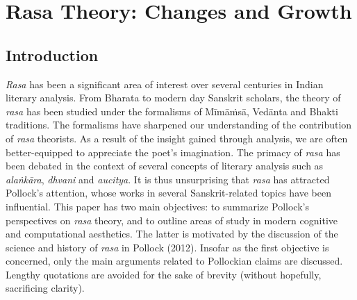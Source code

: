 \chapter[Rasa Theory: Changes and Growth]{Rasa Theory: Changes and Growth}\label{chapter\thechapter:begin}

\section*{Introduction}

\textsl{Rasa }has been a significant area of interest over several centuries in Indian literary analysis. From Bharata to modern day Sanskrit scholars, the theory of \textsl{rasa} has been studied under the formalisms of Mīmāṁsā, Vedānta and Bhakti traditions. The formalisms have sharpened our understanding of the contribution of \textsl{rasa} theorists. As a result of the insight gained through analysis, we are often better-equipped to appreciate the poet’s imagination. The primacy of \textsl{rasa} has been debated in the context of several concepts of literary analysis such as \textsl{alaṅkāra}, \textsl{dhvani} and \textsl{aucitya}. It is thus unsurprising that \textsl{rasa }has attracted Pollock’s attention, whose works in several Sanskrit-related topics have been influential. This paper has two main objectives: to summarize Pollock’s perspectives on \textsl{rasa} theory, and to outline areas of study in modern cognitive and computational aesthetics. The latter is motivated by the discussion of the science and history of \textsl{rasa} in Pollock (2012). Insofar as the first objective is concerned, only the main arguments related to Pollockian claims are discussed. Lengthy quotations are avoided for the sake of brevity (without hopefully, sacrificing clarity). 

